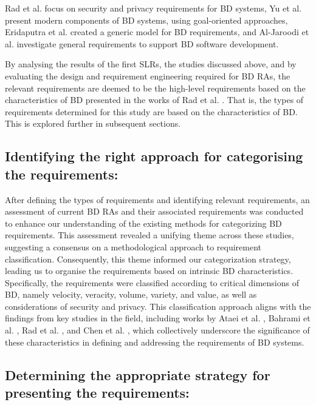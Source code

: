 \documentclass[review]{elsarticle}
\begin{document}
Rad et al. \cite{AtaeiSecurity} focus on security and privacy requirements for BD systems, Yu et al. \cite{yu2019components} present modern components of BD systems, using goal-oriented approaches, Eridaputra et al. \cite{eridaputra2014modeling} created a generic model for BD requirements, and Al-Jaroodi et al. \cite{al2016characteristics} investigate general requirements to support BD software development. 

By analysing the results of the first SLRs, the studies discussed above, and by evaluating the design and requirement engineering required for BD RAs, the relevant requirements are deemed to be the high-level requirements based on the characteristics of BD presented in the works of Rad et al. \cite{Rada2017}. That is, the types of requirements determined for this study are based on the characteristics of BD. This is explored further in subsequent sections.

\subsection{Identifying the right approach for categorising the requirements:}

After defining the types of requirements and identifying relevant requirements, an assessment of current BD RAs and their associated requirements was conducted to enhance our understanding of the existing methods for categorizing BD requirements. This assessment revealed a unifying theme across these studies, suggesting a consensus on a methodological approach to requirement classification. Consequently, this theme informed our categorization strategy, leading us to organise the requirements based on intrinsic BD characteristics. Specifically, the requirements were classified according to critical dimensions of BD, namely velocity, veracity, volume, variety, and value, as well as considerations of security and privacy. This classification approach aligns with the findings from key studies in the field, including works by Ataei et al. \cite{ataei2022state}, Bahrami et al. \cite{Bahrami2015}, Rad et al. \cite{rad2017big}, and Chen et al. \cite{chang2015nist}, which collectively underscore the significance of these characteristics in defining and addressing the requirements of BD systems.

\subsection{Determining the appropriate strategy for presenting the requirements:} 
\end{document}
